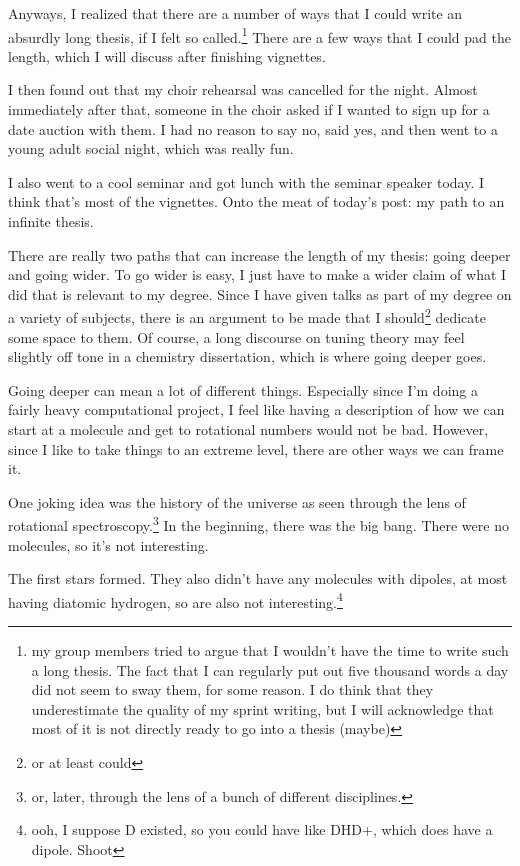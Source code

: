 \documentclass[12pt]{article}[titlepage]
\newcommand{\1}{\={a}}
\newcommand{\2}{\={e}}
\newcommand{\3}{\={\i}}
\newcommand{\4}{\=o}
\newcommand{\5}{\=u}
\newcommand{\6}{\={A}}
\renewcommand{\,}{\textsuperscript{,}}
\begin{document}
Anyways, I realized that there are a number of ways that I could write an absurdly long thesis, if I felt so called.\footnote{my group members tried to argue that I wouldn't have the time to write such a long thesis.
The fact that I can regularly put out five thousand words a day did not seem to sway them, for some reason.
I do think that they underestimate the quality of my sprint writing, but I will acknowledge that most of it is not directly ready to go into a thesis (maybe)}
There are a few ways that I could pad the length, which I will discuss after finishing vignettes.

I then found out that my choir rehearsal was cancelled for the night.
Almost immediately after that, someone in the choir asked if I wanted to sign up for a date auction with them.
I had no reason to say no, said yes, and then went to a young adult social night, which was really fun.

I also went to a cool seminar and got lunch with the seminar speaker today.
I think that's most of the vignettes.
Onto the meat of today's post: my path to an infinite thesis.

There are really two paths that can increase the length of my thesis: going deeper and going wider.
To go wider is easy, I just have to make a wider claim of what I did that is relevant to my degree.
Since I have given talks as part of my degree on a variety of subjects, there is an argument to be made that I should\footnote{or at least could} dedicate some space to them.
Of course, a long discourse on tuning theory may feel slightly off tone in a chemistry dissertation, which is where going deeper goes.

Going deeper can mean a lot of different things.
Especially since I'm doing a fairly heavy computational project, I feel like having a description of how we can start at a molecule and get to rotational numbers would not be bad.
However, since I like to take things to an extreme level, there are other ways we can frame it.

One joking idea was the history of the universe as seen through the lens of rotational spectroscopy.\footnote{or, later, through the lens of a bunch of different disciplines.}
In the beginning, there was the big bang.
There were no molecules, so it's not interesting.

The first stars formed.
They also didn't have any molecules with dipoles, at most having diatomic hydrogen, so are also not interesting.\footnote{ooh, I suppose D existed, so you could have like DHD+, which does have a dipole.
Shoot}
\end{document}
